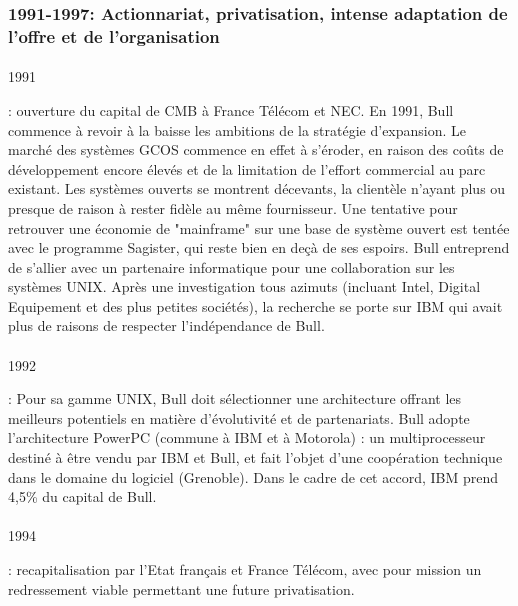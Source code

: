 \documentclass[11pt]{article}
\begin{document}
		\subsubsection{1991-1997: Actionnariat, privatisation, intense adaptation de l’offre et de l’organisation}
		\paragraph{}
		\begin{bf}1991\end{bf}: ouverture du capital de CMB à France Télécom et NEC.\newline{}
		En 1991, Bull commence à revoir à la baisse les ambitions de la stratégie d'expansion. Le marché des systèmes GCOS 
		commence en effet à s'éroder, en raison des coûts de développement encore élevés et de la limitation de l'effort 
		commercial au parc existant.\newline{}
		Les systèmes ouverts se montrent décevants, la clientèle n'ayant plus ou presque de raison à rester fidèle au même 
		fournisseur. Une tentative pour retrouver une économie de "mainframe" sur une base de système ouvert est tentée avec 
		le programme Sagister, qui reste bien en deçà de ses espoirs.\newline{}
		Bull entreprend de s'allier avec un partenaire informatique pour une collaboration sur les systèmes UNIX. Après une 
		investigation tous azimuts (incluant Intel, Digital Equipement et des plus petites sociétés), la recherche se porte 
		sur IBM qui avait plus de raisons de respecter l'indépendance de Bull.
		\paragraph{}
		\begin{bf}1992\end{bf}: Pour sa gamme UNIX, Bull doit sélectionner une architecture offrant les meilleurs potentiels 
		en matière d’évolutivité et de partenariats. Bull adopte l'architecture PowerPC (commune à IBM et à Motorola) : un 
		multiprocesseur destiné à être vendu par IBM et Bull, et fait l’objet d’une coopération technique dans le domaine du 
		logiciel (Grenoble). Dans le cadre de cet accord, IBM prend 4,5\% du capital de Bull.
		\paragraph{}
		\begin{bf}1994\end{bf}: recapitalisation par l’Etat français et France Télécom, avec pour mission un redressement 
		viable permettant une future privatisation.
\end{document}

